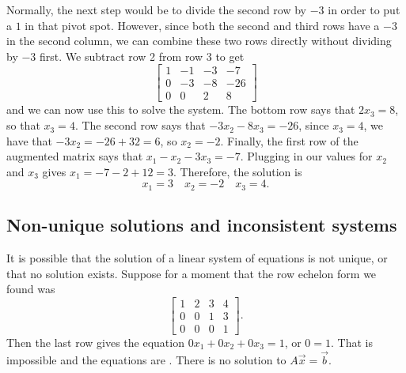 \documentclass{ximera}
\begin{document}
\begin{exampleSol}
    Normally, the next step would be to divide the second row by $-3$ in order to put a $1$ in that pivot spot. However, since both the second and third rows have a $-3$ in the second column, we can combine these two rows directly without dividing by $-3$ first. We subtract row 2 from row 3 to get
    \begin{equation*}
        \left[
            \begin{array}{ccc|c}
                1 & -1 & -3 & -7 \\
                0 & -3 & -8 & -26 \\
                0 & 0 & 2 & 8
            \end{array}
        \right]
    \end{equation*}
    and we can now use this to solve the system. The bottom row says that $2x_3 = 8$, so that $x_3 = 4$. The second row says that $-3x_2 - 8x_3 = -26$, since $x_3 = 4$, we have that $-3x_2 = -26 + 32 = 6$, so $x_2 = -2$. Finally, the first row of the augmented matrix says that $x_1 - x_2 - 3x_3 = -7$. Plugging in our values for $x_2$ and $x_3$ gives $x_1 = -7 - 2 + 12 = 3$. Therefore, the solution is
    \begin{equation*}
        x_1 = 3 \quad x_2 = -2 \quad x_3 = 4.
    \end{equation*}
\end{exampleSol}

\subsection{Non-unique solutions and inconsistent systems}

It is possible that the solution of a linear system of equations is not unique, or that no solution exists.  Suppose for a moment that the row echelon form we found was
\begin{equation*}
    \left[
        \begin{array}{ccc|c}
            1 & 2 & 3 & 4 \\
            0 & 0 & 1 & 3 \\
            0 & 0 & 0 & 1 
        \end{array}
    \right] .
\end{equation*}
Then the last row gives the equation $0x_1 + 0x_2 + 0x_3 = 1$, or $0=1$.  That is impossible and the equations are \emph{}.  There is no solution to $A \vec{x} = \vec{b}$.
\end{document}
